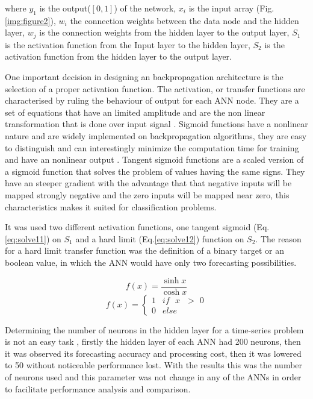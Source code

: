 where $y_1$ is the output($[0, 1]$) of the network, $x_i$ is the input array (Fig. \ref{img:figure2}), $w_i$ the connection weights between the data node and the hidden layer, $w_j$ is the connection weights from the hidden layer to the output layer, $S_1$ is the activation function from the Input layer to the hidden layer, $S_2$ is the activation function from the hidden layer to the output layer.

One important decision in designing an backpropagation architecture is the selection of a proper activation function. The activation, or transfer functions are characterised by ruling the behaviour of output for each ANN node. They are a set of equations that have an limited amplitude and are the non linear transformation that is done over input signal \cite{karlik2011performance}. Sigmoid functions have a nonlinear nature and are widely implemented on backpropagation algorithms, they are easy to distinguish and can interestingly minimize the computation time for training and have an nonlinear output \cite{hecht1992theory, karlik2011performance}. Tangent sigmoid functions are a scaled version of a sigmoid function that solves the problem of values having the same signs. They have an steeper gradient with the advantage that that negative inputs will be mapped strongly negative and the zero inputs will be mapped near zero, this characteristics makes it suited for classification problems.

It was used two different activation functions, one tangent sigmoid (Eq.\ref{eq:solve11}) on $S_1$ and a hard limit (Eq.\ref{eq:solve12}) function on $S_2$. The reason for a hard limit transfer function was the definition of a binary target or an boolean value, in which the ANN would have only two forecasting possibilities.

\begin{equation}
\label{eq:solve11}
f(x) = \frac{\sinh{x}}{\cosh{x}}
\end{equation}
\begin{equation}
\label{eq:solve12}
f(x)=\begin{cases} 
      1 & \text{$if$ $x$ $>$ 0}\\
      0 & \text{$else$}
     \end{cases} 
\end{equation}

Determining the number of neurons in the hidden layer for a time-series problem is not an easy task \cite{zhang1998forecasting}, firstly the hidden layer of each ANN had 200 neurons,
then it was observed its forecasting accuracy and processing cost, then it was lowered to 50 without noticeable performance lost. With the results this was the number of neurons used and this parameter was not change in any of the ANNs in order to facilitate performance analysis and comparison.

